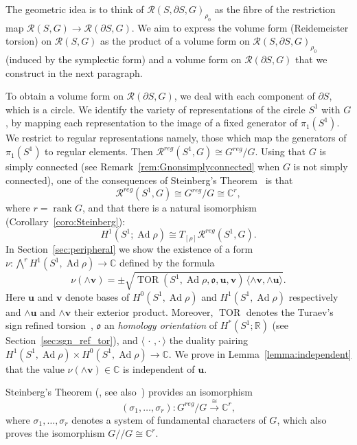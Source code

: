\documentclass[11pt]{article}
\theoremstyle{definition}
\numberwithin{equation}{section}
\numberwithin{figure}{section}
\numberwithin{table}{section}
\DeclareMathOperator{\TOR}{TOR}
\DeclareMathOperator{\Ad}{Ad}
\DeclareMathOperator{\rank}{rank}
\newcommand{\Rcal}{\mathcal{R}}
\newcommand{\Cbb}{\mathbb{C}}
\newcommand{\Rbb}{\mathbb {R}}
\newcommand{\ofrk}{\mathfrak{o}}
\newcommand{\ubf}{\mathbf{u}}
\newcommand{\vbf}{\mathbf{v}}
\begin{document}
The geometric idea is to think of $\Rcal(S,\partial S,G)_{\rho_0}$ as the fibre of the restriction map $\Rcal(S,G)\to \Rcal(\partial S,G)$. We aim to express the volume form (Reidemeister torsion) on $\Rcal(S,G)$ as the product of a volume form on $\Rcal(S,\partial S,G)_{\rho_0}$ (induced by the symplectic form) and a volume form on $\Rcal(\partial S,G)$ that we construct in the next paragraph.

To obtain a volume form on $\Rcal(\partial S,G)$, we deal with each component of $\partial S$, which is a circle. We identify the variety of representations of the circle $S^1$ with $G$, by mapping each representation to the image of a fixed generator of $\pi_1(S^1)$. We restrict to regular representations namely, those which map the generators of $\pi_1(S^1)$ to regular elements. Then $
\Rcal^{reg}(S^1,G)\cong G^{reg}/ G $. Using that $G$ is simply connected (see Remark~\ref{rem:Gnonsimplyconnected} when $G$ is not simply connected), one of the consequences of Steinberg's Theorem~\cite{SteinbergIHES} is that
\[
\Rcal^{reg}(S^1,G)\cong G^{reg}/ G\cong \Cbb^r,
\]
where $r=\rank G$, and that there is a natural isomorphism (Corollary~\ref{coro:Steinberg}):
\[
H^1(S^1; \Ad\rho)\cong T_{ [\rho] } \Rcal^{reg}(S^1,G).
\]
In Section~\ref{sec:peripheral} we show the existence of a form $\nu\colon\bigwedge^{r} H^1(S^1,\Ad\rho)\to \Cbb$ defined by the formula
\begin{equation}\label{eqn:peripheral0}
\nu (\wedge\vbf)=\pm \sqrt{ \TOR(S^1,\Ad\rho, \ofrk,\ubf,\vbf)
\,\langle \wedge\vbf, \wedge\ubf \rangle }.
\end{equation}
Here $\ubf$ and $\vbf$ denote bases of $H^0(S^1,\Ad\rho)$ and $H^1(S^1,\Ad\rho) $ respectively and $\wedge\ubf$ and $\wedge \vbf$ their exterior product. Moreover, $\TOR$ denotes the Turaev's sign refined torsion~\cite[Section~3]{TuraevKnotTheory}, $\ofrk$ an \emph{homology orientation} of $H^*(S^1;\Rbb)$ (see Section~\ref{sec:sgn_ref_tor}), and $\langle\,\cdot\,,\cdot\,\rangle$ the duality pairing $ H^1(S^1,\Ad\rho)\times H^0(S^1,\Ad\rho)\to \Cbb$. We prove in Lemma~\ref{lemma:independent} that the value $\nu(\wedge\vbf)\in\Cbb$ is independent of $\ubf$.


Steinberg's Theorem (\cite{SteinbergIHES}, see also~\cite{Steinberg,Popov}) provides an isomorphism
\[
(\sigma_1,\dots,\sigma_r)\colon G^{reg}/ G\overset{\cong} \longrightarrow \Cbb^r,
\]
where $\sigma_1,\dots, \sigma_r$ denotes a system of fundamental characters of $G$, which also proves the isomorphism $G /\!\!/ G \cong \Cbb^r$.
\end{document}
